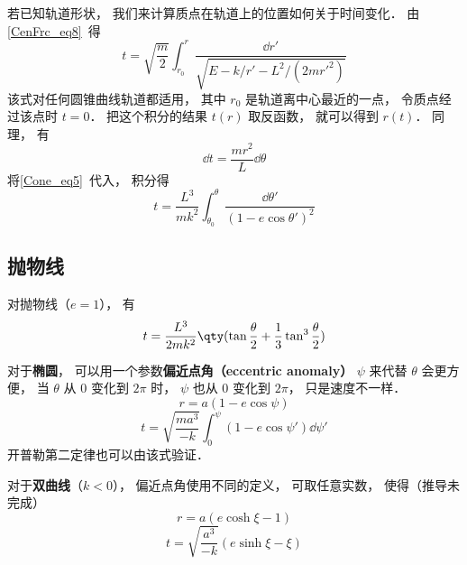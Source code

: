 

若已知轨道形状， 我们来计算质点在轨道上的位置如何关于时间变化． 由\autoref{CenFrc_eq8}~得
\begin{equation}
t = \sqrt{\frac{m}{2}} \int_{r_0}^r \frac{\dd{r'}}{\sqrt{E - k/r' - L^2/(2mr'^2)}}
\end{equation}
该式对任何圆锥曲线轨道都适用， 其中 $r_0$ 是轨道离中心最近的一点， 令质点经过该点时 $t= 0$． 把这个积分的结果 $t(r)$ 取反函数， 就可以得到 $r(t)$． 同理， 有
\begin{equation}
\dd{t} = \frac{mr^2}{L}\dd{\theta}
\end{equation}
将\autoref{Cone_eq5}~代入， 积分得
\begin{equation}
t = \frac{L^3}{mk^2} \int_{\theta_0}^\theta \frac{\dd{\theta'}}{(1 - e\cos \theta')^2 }
\end{equation}

\subsection{抛物线}
对抛物线（$e = 1$）， 有
\begin{equation}
t = \frac{L^3}{2mk^2} \qty(\tan\frac{\theta}{2} +  \frac{1}{3}\tan^3 \frac{\theta}{2})
\end{equation}

对于\textbf{椭圆}， 可以用一个参数\textbf{偏近点角（eccentric anomaly）} $\psi$ 来代替 $\theta$ 会更方便， 当 $\theta$ 从 $0$ 变化到 $2\pi$ 时， $\psi$ 也从 $0$ 变化到 $2\pi$， 只是速度不一样．
\begin{equation}
r = a(1-e\cos\psi)
\end{equation}
\begin{equation}
t = \sqrt{\frac{ma^3}{-k}} \int_0^\psi (1 - e\cos\psi')\dd{\psi'}
\end{equation}
开普勒第二定律也可以由该式验证．

对于\textbf{双曲线}（$k<0$）， 偏近点角使用不同的定义， 可取任意实数， 使得（推导未完成）
\begin{equation}
r = a(e\cosh\xi - 1)
\end{equation}
\begin{equation}
t = \sqrt{\frac{a^3}{-k}} (e\sinh\xi - \xi)
\end{equation}
